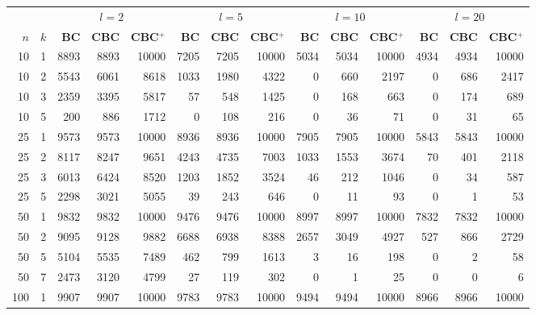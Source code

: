 {

\setlength\tabcolsep{5pt}
\begin{table}
  \begin{center}
  \scriptsize
  \begin{tabular}{|rr | rrr| rrr| rrr| rrr|}
  \hline
   &&\multicolumn{3}{c|}{$l=2$} &\multicolumn{3}{c|}{$l=5$} &\multicolumn{3}{c|}{$l=10$} &\multicolumn{3}{c|}{$l=20$}\\
   \bfseries $n$ & \bfseries $k$
& \bfseries BC & \bfseries CBC & \bfseries CBC$^+$
& \bfseries BC & \bfseries CBC & \bfseries CBC$^+$
& \bfseries BC & \bfseries CBC & \bfseries CBC$^+$
& \bfseries BC & \bfseries CBC & \bfseries CBC$^+$
\\\hline
10&1&
8893&8893&10000&7205&7205&10000&5034&5034&10000&4934&4934&10000\\
10&2&
\cellcolor[gray]{0.85}5543&\cellcolor[gray]{0.85}6061&8618&\cellcolor[gray]{0.85}1033&\cellcolor[gray]{0.85}1980&4322&\cellcolor[gray]{0.85}0&\cellcolor[gray]{0.85}660&2197&\cellcolor[gray]{0.85}0&\cellcolor[gray]{0.85}686&2417\\
10&3&
\cellcolor[gray]{0.85}2359&\cellcolor[gray]{0.85}3395&5817&\cellcolor[gray]{0.85}57&\cellcolor[gray]{0.85}548&1425&0&168&663&0&174&689\\
10&5&
\cellcolor[gray]{0.85}200&\cellcolor[gray]{0.85}886&1712&0&108&216&0&36&71&0&31&65\\
\hline
25&1&
9573&9573&10000&8936&8936&10000&7905&7905&10000&5843&5843&10000\\
25&2&
8117&8247&9651&\cellcolor[gray]{0.85}4243&\cellcolor[gray]{0.85}4735&7003&\cellcolor[gray]{0.85}1033&\cellcolor[gray]{0.85}1553&3674&70&401&2118\\
25&3&
\cellcolor[gray]{0.85}6013&\cellcolor[gray]{0.85}6424&8520&\cellcolor[gray]{0.85}1203&\cellcolor[gray]{0.85}1852&3524&46&212&1046&0&34&587\\
25&5&
\cellcolor[gray]{0.85}2298&\cellcolor[gray]{0.85}3021&5055&39&243&646&0&11&93&0&1&53\\
\hline
50&1&
9832&9832&10000&9476&9476&10000&8997&8997&10000&7832&7832&10000\\
50&2&
9095&9128&9882&6688&6938&8388&2657&3049&4927&527&866&2729\\
50&5&
\cellcolor[gray]{0.85}5104&\cellcolor[gray]{0.85}5535&7489&462&799&1613&3&16&198&0&2&58\\
50&7&
\cellcolor[gray]{0.85}2473&\cellcolor[gray]{0.85}3120&4799&27&119&302&0&1&25&0&0&6\\
\hline
100&1&
9907&9907&10000&9783&9783&10000&9494&9494&10000&8966&8966&10000\\

\end{tabular}
\end{center}
\end{table}}
